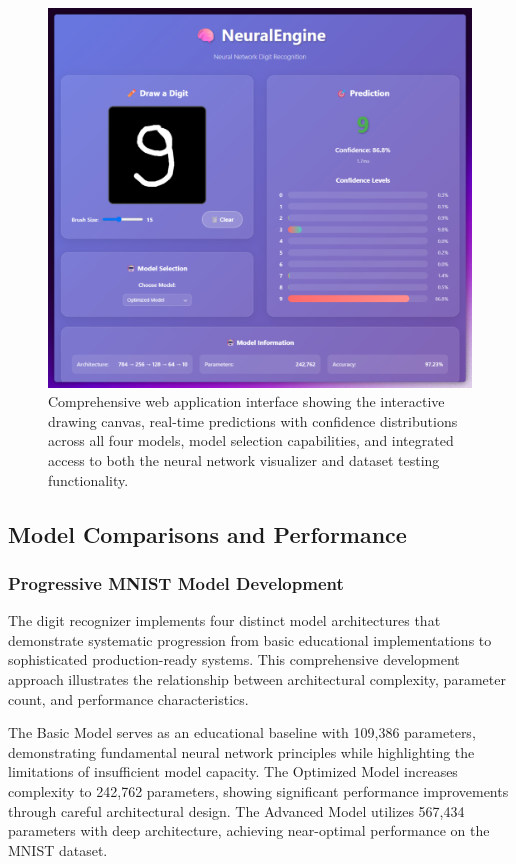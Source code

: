 \documentclass[11pt,a4paper]{report}
\begin{document}
\begin{figure}[H]
\centering
\includegraphics[width=\textwidth]{digit_recognizer_web_interface.png}
\caption{Comprehensive web application interface showing the interactive drawing canvas, real-time predictions with confidence distributions across all four models, model selection capabilities, and integrated access to both the neural network visualizer and dataset testing functionality.}
\label{fig:digit_web_interface}
\end{figure}

\subsection{Model Comparisons and Performance}

\subsubsection{Progressive MNIST Model Development}

The digit recognizer implements four distinct model architectures that demonstrate systematic progression from basic educational implementations to sophisticated production-ready systems. This comprehensive development approach illustrates the relationship between architectural complexity, parameter count, and performance characteristics.

The Basic Model serves as an educational baseline with 109,386 parameters, demonstrating fundamental neural network principles while highlighting the limitations of insufficient model capacity. The Optimized Model increases complexity to 242,762 parameters, showing significant performance improvements through careful architectural design. The Advanced Model utilizes 567,434 parameters with deep architecture, achieving near-optimal performance on the MNIST dataset.
\end{document}

